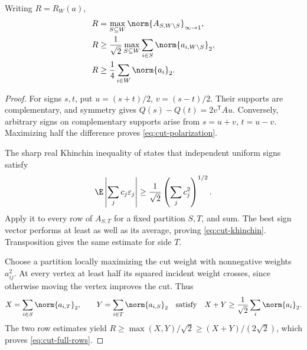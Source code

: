 \begin{lemma}\label{lem:cut-row}
Writing $R=R_W(a)$,
\begin{align}
 R&=\max_{S\subseteq W}\norm{A_{S,W\setminus S}}_{\infty\to1},
    \label{eq:cut-polarization}\\
 R&\ge\frac1{\sqrt2}\max_{S\subseteq W}
          \sum_{i\in S}\norm{a_{i,W\setminus S}}_2,
    \label{eq:cut-khinchin}\\
 R&\ge\frac14\sum_{i\in W}\norm{a_i}_2.\label{eq:cut-full-rows}
\end{align}
\end{lemma}
\begin{proof}
For signs $s,t$, put $u=(s+t)/2$, $v=(s-t)/2$. Their supports are
complementary, and symmetry gives $Q(s)-Q(t)=2v^{\mathsf T}Au$.
Conversely, arbitrary signs on complementary supports arise from
$s=u+v$, $t=u-v$. Maximizing half the difference proves
\eqref{eq:cut-polarization}.

The sharp real Khinchin inequality of \citet{Szarek1976} states that
independent uniform signs satisfy
\begin{equation}\label{eq:khinchin}
 \E\left|\sum_j c_j\varepsilon_j\right|
       \ge\frac1{\sqrt2}\left(\sum_j c_j^2\right)^{1/2}.
\end{equation}
Apply it to every row of $A_{S,T}$ for a fixed partition $S,T$, and sum.
The best sign vector performs at least as well as its average, proving
\eqref{eq:cut-khinchin}. Transposition gives the same estimate for side $T$.

Choose a partition locally maximizing the cut weight with nonnegative
weights $a_{ij}^2$. At every vertex at least half its squared incident
weight crosses, since otherwise moving the vertex improves the cut. Thus
\[
 X=\sum_{i\in S}\norm{a_{i,T}}_2,\qquad
 Y=\sum_{i\in T}\norm{a_{i,S}}_2
 \quad\text{satisfy}\quad
 X+Y\ge\frac1{\sqrt2}\sum_i\norm{a_i}_2.
\]
The two row estimates yield
$R\ge\max(X,Y)/\sqrt2\ge(X+Y)/(2\sqrt2)$, which proves
\eqref{eq:cut-full-rows}.
\end{proof}

